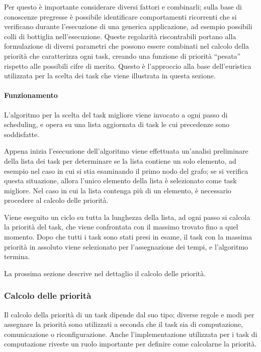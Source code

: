 Per questo è importante considerare diversi fattori e combinarli; sulla 
base di conoscenze pregresse è possibile identificare comportamenti 
ricorrenti che si verificano durante l'esecuzione di una generica applicazione, 
ad esempio possibili colli di bottiglia nell'esecuzione. Queste regolarità 
riscontrabili portano alla formulazione di diversi parametri che possono essere 
combinati nel calcolo della priorità che caratterizza ogni task, creando una 
funzione di priorità ``pesata'' rispetto alle possibili cifre di merito. Questo 
è l'approccio alla base dell'euristica utilizzata per la scelta dei task che 
viene illustrata in questa sezione.


\paragraph{Funzionamento}
L'algoritmo per la scelta del task migliore viene invocato a ogni passo di 
scheduling, e opera su una lista aggiornata di task le cui precedenze sono 
soddisfatte.

Appena inizia l'esecuzione dell'algoritmo viene effettuata un'analisi 
preliminare della lista dei task per determinare se la lista contiene un solo 
elemento, ad esempio nel caso in cui si stia esaminando il primo nodo del 
grafo; se si verifica questa situazione, allora l'unico elemento della lista è 
selezionato come task migliore. Nel caso in cui la lista contenga più di un 
elemento, è necessario procedere al calcolo delle priorità.

Viene eseguito un ciclo su tutta la lunghezza della lista, ad ogni passo 
si calcola la priorità del task, che viene confrontata con il massimo trovato
fino a quel momento. Dopo che tutti i task sono stati presi in esame, il task 
con la massima priorità in assoluto viene selezionato per l'assegnazione dei 
tempi, e l'algoritmo termina.

La prossima sezione descrive nel dettaglio il calcolo delle priorit\`a.


\subsubsection{Calcolo delle priorità}
Il calcolo della priorità di un task dipende dal suo tipo; diverse regole e 
modi per assegnare la priorità sono utilizzati a seconda che il task sia di 
computazione, comunicazione o riconfigurazione. Anche l'implementazione 
utilizzata per i task di computazione riveste un ruolo importante per definire 
come calcolarne la priorità.

